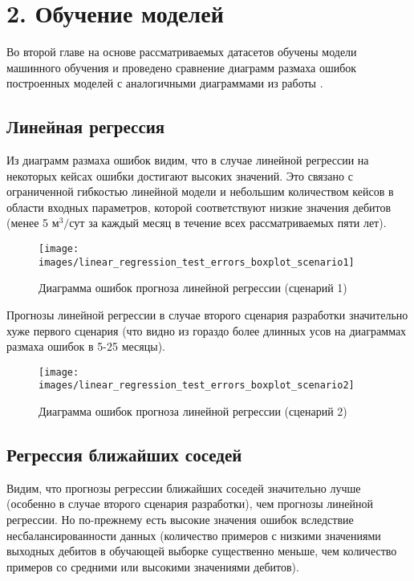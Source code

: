 \chapter*{2. Обучение моделей} \label{ch2}
Во второй главе на основе рассматриваемых датасетов обучены модели машинного обучения и проведено сравнение диаграмм размаха ошибок построенных моделей с аналогичными диаграммами из работы \cite{muravtsev:metamodel}.

\section{Линейная регрессия} \label{ch1:sec1}
Из диаграмм размаха ошибок видим, что в случае линейной регрессии на некоторых кейсах ошибки достигают высоких значений. Это связано с ограниченной гибкостью линейной модели и небольшим количеством кейсов в области входных параметров, которой соответствуют низкие значения дебитов (менее 5 $\text{м}^3/\text{сут}$ за каждый месяц в течение всех рассматриваемых пяти лет).

\begin{figure}[H] 
	\center
	\texttt{[image: images/linear\_regression\_test\_errors\_boxplot\_scenario1]}
	\caption{Диаграмма ошибок прогноза линейной регрессии (сценарий 1)} 
	\label{fig:lin-reg-1}
\end{figure}

Прогнозы линейной регрессии в случае второго сценария разработки значительно хуже первого сценария (что видно из гораздо более длинных усов на диаграммах размаха ошибок в 5-25 месяцы).

\begin{figure}[H] 
	\center
	\texttt{[image: images/linear\_regression\_test\_errors\_boxplot\_scenario2]}
	\caption{Диаграмма ошибок прогноза линейной регрессии (сценарий 2)} 
	\label{fig:lin-reg-2}
\end{figure}


\section{Регрессия ближайших соседей} \label{ch1:sec2}

Видим, что прогнозы регрессии ближайших соседей значительно лучше (особенно в случае второго сценария разработки), чем прогнозы линейной регрессии. Но по-прежнему есть высокие значения ошибок вследствие несбалансированности данных (количество примеров с низкими значениями выходных дебитов в обучающей выборке существенно меньше, чем количество примеров со средними или высокими значениями дебитов).  

